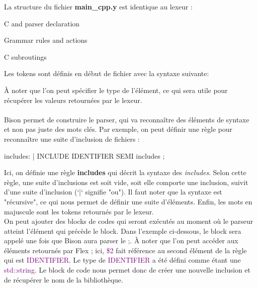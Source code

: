 \documentclass[a4paper]{article}
\begin{document}
La structure du fichier \textbf{main\_cpp.y} est identique au lexeur :

\begin{code}
C and parser declaration

Grammar rules and actions

C subroutings
\end{code}\leavevmode\newline

Les tokens sont définis en début de fichier avec la syntaxe suivante:

\begin{code}
\end{code}\leavevmode\newline

À noter que l'on peut spécifier le type de l'élément, ce qui sera utile pour
récupérer les valeurs retournées par le lexeur.\\~\\


Bison permet de construire le parser, qui va reconnaître des éléments de syntaxe
et non pas juste des mots clés. Par exemple, on peut définir une règle pour
reconnaître une suite d'inclusion de fichiers :\\

\begin{code}[language=c++]
includes: %
       | INCLUDE IDENTIFIER SEMI includes
       ;
\end{code}\leavevmode\newline

Ici, on définie une règle \textbf{includes} qui décrit la syntaxe des \textit{includes}. Selon cette règle, une suite d'inclusions est soit vide, soit elle comporte une inclusion, suivit d'une suite d'inclusion (`|` signifie "ou"). Il faut noter que la syntaxe est "récursive", ce qui nous permet de définir une suite d'éléments.
Enfin, les mots en majuscule sont les tokens retournés par le lexeur.\\

On peut ajouter des blocks de codes qui seront exécutés au moment où le parseur
atteint l'élément qui précède le block. Dans l'exemple ci-dessous, le block sera appelé une fois que Bison aura parser le \textcolor{purple}{;}. À noter que l'on peut accéder aux éléments retournés par Flex ; ici, \textcolor{purple}{\$2} fait référence au second élément de la règle qui est \textcolor{purple}{IDENTIFIER}. Le type de \textcolor{purple}{IDENTIFIER} a été défini comme étant une \textcolor{purple}{std::string}. Le block de code nous permet donc de créer une nouvelle inclusion et de récupérer le nom de la bibliothèque.\\
\end{document}
